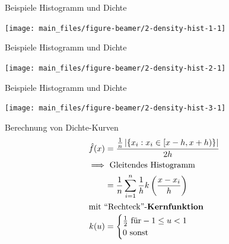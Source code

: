 \documentclass[
  10pt,
  ignorenonframetext,
]{beamer}
\begin{document}
\begin{frame}{Beispiele Histogramm und Dichte}
\label{beispiele-histogramm-und-dichte}
\scriptsize

\begin{center}\texttt{[image: main\_files/figure-beamer/2-density-hist-1-1]} \end{center}

\normalsize
\end{frame}

\begin{frame}{Beispiele Histogramm und Dichte}
\label{beispiele-histogramm-und-dichte-1}
\scriptsize

\begin{center}\texttt{[image: main\_files/figure-beamer/2-density-hist-2-1]} \end{center}

\normalsize
\end{frame}

\begin{frame}{Beispiele Histogramm und Dichte}
\label{beispiele-histogramm-und-dichte-2}
\scriptsize

\begin{center}\texttt{[image: main\_files/figure-beamer/2-density-hist-3-1]} \end{center}

\normalsize
\end{frame}

\begin{frame}{Berechnung von Dichte-Kurven}
\label{berechnung-von-dichte-kurven}
\begin{align*} 
\hat f(x) &= \frac{\frac{1}{n} \left|\{x_i : x_i \in [x-h,x+h)\}\right|}{2h}\\ 
\intertext{$\implies$ Gleitendes Histogramm}
          &= \frac{1}{n} \sum_{i=1}^n \frac{1}{h} k \left(\frac{x - x_i}{h}\right)\\
\intertext{mit ``Rechteck''-\textbf{Kernfunktion}}
k(u) &= \begin{cases}
  \frac{1}{2} \text{ für} -1 \leq u < 1 \\
            0 \text{ sonst} \end{cases}
\end{align*}
\end{frame}
\end{document}
